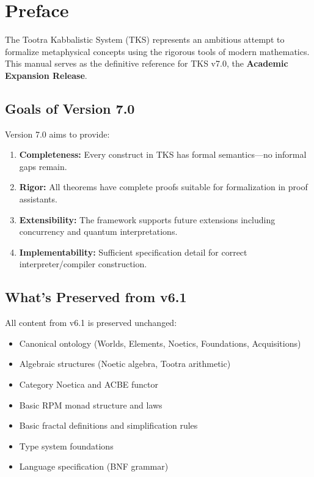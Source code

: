 \documentclass[11pt,twoside,openright]{book}
\theoremstyle{definition}
\theoremstyle{plain}
\theoremstyle{remark}
\begin{document}
\chapter*{Preface}

The Tootra Kabbalistic System (TKS) represents an ambitious attempt to formalize metaphysical concepts using the rigorous tools of modern mathematics. This manual serves as the definitive reference for TKS v7.0, the \textbf{Academic Expansion Release}.

\section*{Goals of Version 7.0}

Version 7.0 aims to provide:

\begin{enumerate}
  \item \textbf{Completeness:} Every construct in TKS has formal semantics---no informal gaps remain.

  \item \textbf{Rigor:} All theorems have complete proofs suitable for formalization in proof assistants.

  \item \textbf{Extensibility:} The framework supports future extensions including concurrency and quantum interpretations.

  \item \textbf{Implementability:} Sufficient specification detail for correct interpreter/compiler construction.
\end{enumerate}

\section*{What's Preserved from v6.1}

All content from v6.1 is preserved unchanged:
\begin{itemize}
  \item Canonical ontology (Worlds, Elements, Noetics, Foundations, Acquisitions)
  \item Algebraic structures (Noetic algebra, Tootra arithmetic)
  \item Category Noetica and ACBE functor
  \item Basic RPM monad structure and laws
  \item Basic fractal definitions and simplification rules
  \item Type system foundations
  \item Language specification (BNF grammar)
\end{itemize}
\end{document}
